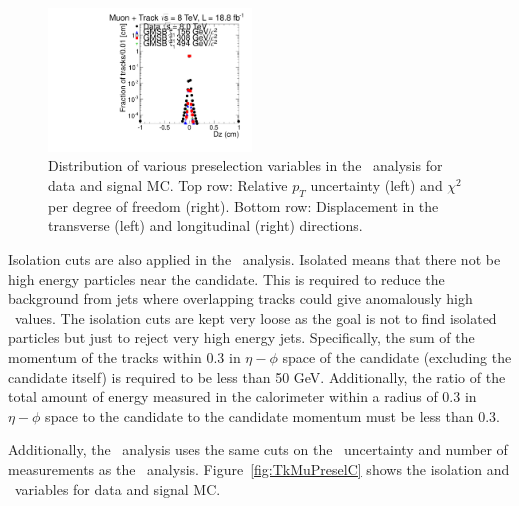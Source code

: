 \begin{figure}
  \includegraphics[clip=false, trim=0.0cm 0cm 0.0cm 0cm, width=0.48\textwidth]{figures/tkmu/Selection_Comp_8TeV_GMStau_Dz_BS}
  \caption[Distribution of relative \pt\ uncertainty, $\chi^2$ per degree of freedom, and transverse and longitudinal
displacement in the \tktof\ analysis for data and signal MC.]
{Distribution of various preselection variables in the \tktof\ analysis for data and signal MC.
Top row: Relative $p_T$ uncertainty (left) and $\chi^2$ per degree of freedom (right).
Bottom row: Displacement in the transverse (left) and longitudinal (right) directions.}
    \label{fig:TkMuPreselB}
\end{figure}

Isolation cuts are also applied in the \tktof\ analysis. Isolated means that there not be high energy particles near the candidate.
This is required to reduce the background from jets where overlapping tracks could give
anomalously high \dedx\ values. The isolation cuts are kept very loose as the goal is not to find isolated particles but just to reject very high energy jets.
Specifically, the sum of the momentum of the tracks within 0.3 in $\eta-\phi$ 
space of the candidate (excluding the candidate itself) is required to be less than 50 GeV. Additionally, the ratio of the total
amount of energy measured in the calorimeter within a radius of 0.3 in $\eta-\phi$ space to the candidate to the candidate momentum must be less than 0.3.

Additionally, the \tktof\ analysis uses the same cuts on the \invbeta\ uncertainty and number of measurements as the \muononly\ analysis.
Figure~\ref{fig:TkMuPreselC} shows the isolation and \invbeta\ variables for data and signal MC.

